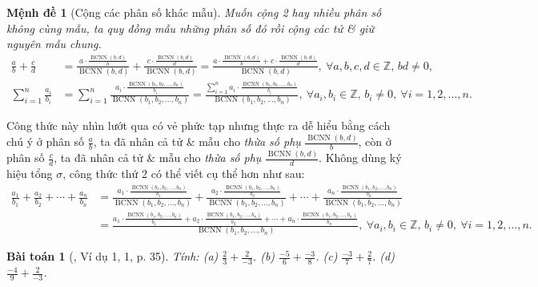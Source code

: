 \documentclass{article}
\newtheorem{baitoan}{Bài toán}
\newtheorem{menhde}{Mệnh đề}
\begin{document}
\begin{menhde}[Cộng các phân số khác mẫu]
	Muốn cộng 2 hay nhiều phân số không cùng mẫu, ta quy đồng mẫu những phân số đó rồi cộng các tử \& giữ nguyên mẫu chung.
	\begin{align*}
		\frac{a}{b} + \frac{c}{d} &= \frac{a\cdot\frac{\operatorname{BCNN}(b,d)}{b}}{\operatorname{BCNN}(b,d)} + \frac{c\cdot\frac{\operatorname{BCNN}(b,d)}{d}}{\operatorname{BCNN}(b,d)} = \frac{a\cdot\frac{\operatorname{BCNN}(b,d)}{b} + c\cdot\frac{\operatorname{BCNN}(b,d)}{d}}{\operatorname{BCNN}(b,d)},\ \forall a,b,c,d\in\mathbb{Z},\,bd\ne0,\\
		\sum_{i=1}^n \frac{a_i}{b_i} &= \sum_{i=1}^n \frac{a_i\cdot\frac{\operatorname{BCNN}(b_1,b_2,\ldots,b_n)}{b_i}}{\operatorname{BCNN}(b_1,b_2,\ldots,b_n)} = \frac{\sum_{i=1}^n a_i\cdot\frac{\operatorname{BCNN}(b_1,b_2,\ldots,b_n)}{b_i}}{\operatorname{BCNN}(b_1,b_2,\ldots,b_n)},\ \forall a_i,b_i\in\mathbb{Z},\,b_i\ne0,\ \forall i = 1,2,\ldots,n.
	\end{align*}
\end{menhde}
Công thức này nhìn lướt qua có vẻ phức tạp nhưng thực ra dễ hiểu bằng cách chú ý ở phân số $\frac{a}{b}$, ta đã nhân cả tử \& mẫu cho \textit{thừa số phụ} $\frac{\operatorname{BCNN}(b,d)}{b}$, còn ở phân số $\frac{c}{d}$, ta đã nhân cả tử \& mẫu cho \textit{thừa số phụ} $\frac{\operatorname{BCNN}(b,d)}{d}$. Không dùng ký hiệu tổng $\sigma$, công thức thứ 2 có thể viết cụ thể hơn như sau:
\begin{align*}
	\frac{a_1}{b_1} + \frac{a_2}{b_2} + \cdots + \frac{a_n}{b_n} &= \frac{a_1\cdot\frac{\operatorname{BCNN}(b_1,b_2,\ldots,b_n)}{b_1}}{\operatorname{BCNN}(b_1,b_2,\ldots,b_n)} + \frac{a_2\cdot\frac{\operatorname{BCNN}(b_1,b_2,\ldots,b_n)}{b_2}}{\operatorname{BCNN}(b_1,b_2,\ldots,b_n)} + \cdots + \frac{a_n\cdot\frac{\operatorname{BCNN}(b_1,b_2,\ldots,b_n)}{b_n}}{\operatorname{BCNN}(b_1,b_2,\ldots,b_n)}\\
	&= \frac{a_1\cdot\frac{\operatorname{BCNN}(b_1,b_2,\ldots,b_n)}{b_1} + a_2\cdot\frac{\operatorname{BCNN}(b_1,b_2,\ldots,b_n)}{b_2} + \cdots + a_n\cdot\frac{\operatorname{BCNN}(b_1,b_2,\ldots,b_n)}{b_n}}{\operatorname{BCNN}(b_1,b_2,\ldots,b_n)},\ \forall a_i,b_i\in\mathbb{Z},\,b_i\ne0,\ \forall i = 1,2,\ldots,n.
\end{align*}

\begin{baitoan}[\cite{SGK_Toan_6_Canh_Dieu_tap_2}, Ví dụ 1, 1, p. 35]
	Tính: (a) $\frac{2}{3} + \frac{2}{-3}$. (b) $\frac{-5}{6} + \frac{-3}{8}$. (c) $\frac{-3}{7} + \frac{2}{7}$. (d) $\frac{-4}{9} + \frac{2}{-3}$.
\end{baitoan}
\end{document}
